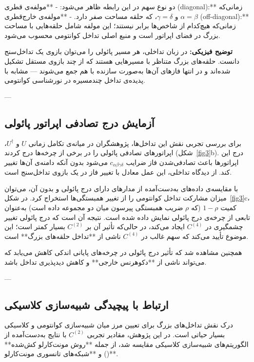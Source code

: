 دو نوع سهم در این رابطه ظاهر می‌شود:
- **مولفه‌ی قطری (diagonal):** زمانی‌که \(\alpha=\beta\) و \(\gamma=\delta\)، که حلقه مساحت صفر دارد.  
- **مولفه‌ی خارج‌قطری (off-diagonal):** زمانی‌که هیچ‌کدام از شاخص‌ها برابر نیستند؛ این مولفه شامل حلقه‌هایی با مساحت بزرگ در فضای اپراتور است و منبع اصلی تداخل کوانتومی محسوب می‌شود.

\textbf{توضیح فیزیکی:}  
در زبان تداخلی، هر مسیر پائولی را می‌توان بازوی یک تداخل‌سنج دانست. حلقه‌های بزرگ متناظر با مسیرهایی هستند که از چند بازوی مستقل تشکیل شده‌اند و در انتها فازهای آن‌ها به‌صورت سازنده با هم جمع می‌شوند — مشابه با پدیده‌ی تداخل چندمسیره در نورشناسی کوانتومی.

---

\subsection{آزمایش درج تصادفی اپراتور پائولی}

برای بررسی تجربی نقش این تداخل‌ها، پژوهشگران در میانه‌ی تکامل زمانی \(U\) و \(U^\dagger\)، اپراتورهای تصادفی پائولی را در برخی از چرخه‌ها درج کردند (شکل~\ref{fig3}b).  
درج این اپراتورها باعث تصادفی‌شدن فاز ضرایب \(c_{\alpha\beta\gamma\delta}\) می‌شود بدون آنکه دامنه‌ی آن‌ها تغییر کند.  
از دیدگاه تداخلی، این عمل معادل با تغییر فاز در یک بازوی تداخل‌سنج است.

با مقایسه‌ی داده‌های به‌دست‌آمده از مدارهای دارای درج پائولی و بدون آن، می‌توان میزان مشارکت تداخل کوانتومی را از تغییر همبستگی‌ها استخراج کرد.  
در شکل~\ref{fig3}c، کمیت \(1-\rho\) (که \(\rho\) ضریب همبستگی پیرسون میان دو مجموعه داده است) به‌عنوان تابعی از چرخه‌ی درج پائولی نمایش داده شده است.  
نتیجه آن است که درج پائولی تغییر چشمگیری در \(C^{(4)}\) ایجاد می‌کند، در حالی‌که تأثیر آن بر \(C^{(2)}\) بسیار کمتر است؛ این موضوع تأیید می‌کند که سهم غالب در \(C^{(4)}\) ناشی از **تداخل حلقه‌های بزرگ** است.

همچنین مشاهده شد که تأثیر درج پائولی در چرخه‌های پایانی اندکی کاهش می‌یابد که می‌تواند ناشی از **دکوهرنس خارجی** و کاهش دیدپذیری تداخل باشد.

---

\subsection{ارتباط با پیچیدگی شبیه‌سازی کلاسیکی}

درک نقش تداخل‌های بزرگ برای تعیین مرز میان شبیه‌سازی کوانتومی و کلاسیکی بسیار حیاتی است.  
در این پژوهش، مقادیر تجربی \(C^{(2)}\) با نتایج به‌دست‌آمده از الگوریتم‌های شبیه‌سازی کلاسیکی مقایسه شد، از جمله **روش مونت‌کارلو کش‌شده** () و **شبکه‌های تانسوری مونت‌کارلو**.

